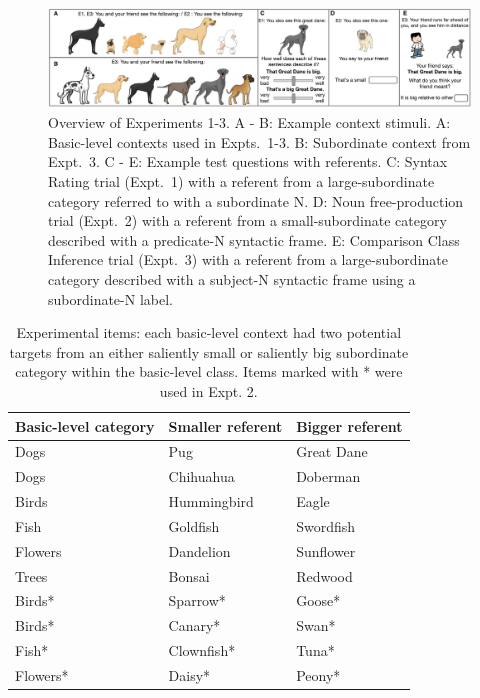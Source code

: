 \documentclass[10pt,letterpaper]{article}
\begin{document}
\begin{figure}[t]
\begin{center}
\includegraphics[width=\textwidth]{screenshots.pdf}
\end{center}
\caption{Overview of Experiments 1-3. A - B: Example context stimuli. A: Basic-level contexts used in Expts.~1-3. B: Subordinate context from Expt.~3. C - E: Example test questions with referents. C: Syntax Rating trial (Expt.~1) with a referent from a large-subordinate category referred to with a subordinate N. D: Noun free-production trial (Expt.~2) with a referent from a small-subordinate category described with a predicate-N syntactic frame. E: Comparison Class Inference trial (Expt.~3) with a referent from a large-subordinate category described with a subject-N syntactic frame using a subordinate-N label.} 
\label{screenshots}
\end{figure}
\begin{table}[t]
\small{
\begin{center}
\caption{Experimental items: each basic-level context had two potential targets from an either saliently small or saliently big subordinate category within the basic-level class. Items marked with * were used in Expt. 2.}
\label{tab:stimuli}
\vskip 0.12in
\fontsize{10}{11}\selectfont
\begin{tabularx}{\linewidth}{lll}
\hline
 Basic-level category & Smaller referent & Bigger referent\\
\hline
 Dogs & Pug & Great Dane \\
 Dogs & Chihuahua & Doberman\\
 Birds & Hummingbird & Eagle  \\
 Fish & Goldfish & Swordfish \\
 Flowers & Dandelion & Sunflower\\
 Trees & Bonsai & Redwood\\
Birds* & Sparrow* & Goose* \\
Birds* & Canary* & Swan* \\
Fish* & Clownfish* & Tuna* \\
Flowers* & Daisy* & Peony* \\
\hline     
\end{tabularx}
\end{center}
}
\end{table}
\end{document}
